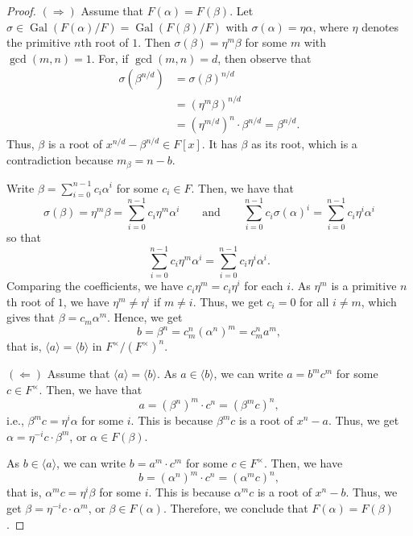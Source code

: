 \documentclass[twoside]{article}
\DeclareMathOperator\Gal{Gal}
\theoremstyle{remark}
\begin{document}
\begin{proof}
  \((\Rightarrow)\) Assume that \(F(\alpha) = F(\beta)\). Let \(\sigma \in \Gal(F(\alpha)/F) = \Gal(F(\beta)/F)\) with \(\sigma(\alpha) = \eta\alpha\), where \(\eta\) denotes the primitive \(n\)th root of \(1\). Then \(\sigma(\beta) = \eta^m \beta\) for some \(m\) with \(\gcd(m,n) = 1\). For, if \(\gcd(m,n) = d\), then observe that
  \begin{align*}
    \sigma(\beta^{n/d}) & = \sigma(\beta)^{n/d} \\
    & = \left( \eta^m \beta \right)^{n/d} \\
    & = \left( \eta^{m/d} \right)^n \cdot \beta^{n/d} = \beta^{n/d}.
  \end{align*}
  Thus, \(\beta\) is a root of \(x^{n/d} - \beta^{n/d} \in F[x]\). It has \(\beta\) as its root, which is a contradiction because \(m_\beta = n - b\).
  
  Write \(\beta = \sum_{i=0}^{n-1} c_i \alpha^i\) for some \(c_i \in F\). Then, we have that
  \[ \sigma(\beta) = \eta^m \beta = \sum_{i=0}^{n-1} c_i \eta^m \alpha^i \qquad \text{and} \qquad \sum_{i=0}^{n-1} c_i \sigma(\alpha)^i = \sum_{i=0}^{n-1} c_i \eta^i \alpha^i \]
  so that
  \[ \sum_{i=0}^{n-1} c_i \eta^m \alpha^i = \sum_{i=0}^{n-1} c_i \eta^i \alpha^i. \]
  Comparing the coefficients, we have \(c_i\eta^m = c_i\eta^i\) for each \(i\). As \(\eta^m\) is a primitive \(n\)th root of \(1\), we have \(\eta^m \neq \eta^i\) if \(m \neq i\). Thus, we get \(c_i = 0\) for all \(i \neq m\), which gives that \(\beta = c_m \alpha^m\). Hence, we get
  \[ b = \beta^n = c_m^n (\alpha^n)^m = c_m^n a^m, \]
  that is, \(\langle a \rangle = \langle b \rangle\) in \(F^\times / (F^\times)^n\).
  
  \((\Leftarrow)\) Assume that \(\langle a \rangle = \langle b \rangle\). As \(a \in \langle b \rangle\), we can write \(a = b^m c^m\) for some \(c \in F^\times\). Then, we have that
  \[ a = (\beta^n)^m \cdot c^n = (\beta^m c)^n, \]
  i.e., \(\beta^m c = \eta^i \alpha\) for some \(i\). This is because \(\beta^m c\) is a root of \(x^n - a\). Thus, we get \(\alpha = \eta^{-i} c \cdot \beta^m\), or \(\alpha \in F(\beta)\).
  
  As \(b \in \langle a \rangle\), we can write \(b = a^m \cdot c^m\) for some \(c \in F^\times\). Then, we have
  \[ b = (\alpha^n)^m \cdot c^n = (\alpha^m c)^n, \]
  that is, \(\alpha^m c = \eta^i \beta\) for some \(i\). This is because \(\alpha^m c\) is a root of \(x^n-b\). Thus, we get \(\beta = \eta^{-i} c \cdot \alpha^m\), or \(\beta \in F(\alpha)\). Therefore, we conclude that \(F(\alpha) = F(\beta)\).
\end{proof}
\end{document}
